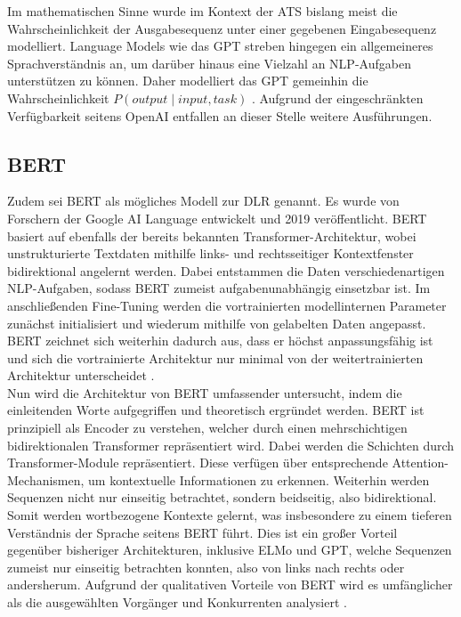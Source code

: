 \noindent
Im mathematischen Sinne wurde im Kontext der \ac{ATS} bislang meist die Wahrscheinlichkeit der Ausgabesequenz unter einer gegebenen Eingabesequenz modelliert. Language Models wie das \ac{GPT} streben hingegen ein allgemeineres Sprachverständnis an, um darüber hinaus eine Vielzahl an \ac{NLP}-Aufgaben unterstützen zu können. Daher modelliert das \ac{GPT} gemeinhin die Wahrscheinlichkeit $P(output \mid input, task)$ \cite[S.~2]{RAD19}. Aufgrund der eingeschränkten Verfügbarkeit seitens OpenAI entfallen an dieser Stelle weitere Ausführungen.


\subsection{BERT}
\noindent
Zudem sei \ac{BERT} als mögliches Modell zur \ac{DLR} genannt. Es wurde von Forschern der Google AI Language entwickelt und 2019 veröffentlicht. \ac{BERT} basiert auf ebenfalls der bereits bekannten Transformer-Architektur, wobei unstrukturierte Textdaten mithilfe links- und rechtsseitiger Kontextfenster bidirektional angelernt werden. Dabei entstammen die Daten verschiedenartigen \ac{NLP}-Aufgaben, sodass \ac{BERT} zumeist aufgabenunabhängig einsetzbar ist. Im anschließenden Fine-Tuning werden die vortrainierten modellinternen Parameter zunächst initialisiert und wiederum mithilfe von gelabelten Daten angepasst. \ac{BERT} zeichnet sich weiterhin dadurch aus, dass er höchst anpassungsfähig ist und sich die vortrainierte Architektur nur minimal von der weitertrainierten Architektur unterscheidet \cite[S.~1-3]{DEV19}.\\

\noindent
Nun wird die Architektur von \ac{BERT} umfassender untersucht, indem die einleitenden Worte aufgegriffen und theoretisch ergründet werden. \ac{BERT} ist prinzipiell als Encoder zu verstehen, welcher durch einen mehrschichtigen bidirektionalen Transformer repräsentiert wird. Dabei werden die Schichten durch Transformer-Module repräsentiert. Diese verfügen über entsprechende Attention-Mechanismen, um kontextuelle Informationen zu erkennen. Weiterhin werden Sequenzen nicht nur einseitig betrachtet, sondern beidseitig, also bidirektional. Somit werden wortbezogene Kontexte gelernt, was insbesondere zu einem tieferen Verständnis der Sprache seitens \ac{BERT} führt. Dies ist ein großer Vorteil gegenüber bisheriger Architekturen, inklusive \ac{ELMo} und \ac{GPT}, welche Sequenzen zumeist nur einseitig betrachten konnten, also von links nach rechts oder andersherum. Aufgrund der qualitativen Vorteile von \ac{BERT} wird es umfänglicher als die ausgewählten Vorgänger und Konkurrenten analysiert \cite[S.~3]{DEV19}.
\newpage

